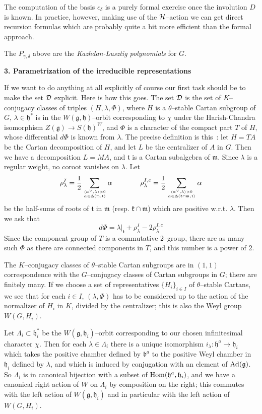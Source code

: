 \documentclass[11 pt]{article}
\def\ra{\rightarrow}
\def\a{\alpha}
\def\ac{\alpha^\vee}
\def\b{{\mathfrak b}}
\def\D{{\cal D}}
\def\d{\delta}
\def\F{\Phi}
\def\g{\gamma}
\def\gf{{\mathfrak g}}
\def\Hc{{\cal H}}
\def\Hom{{\rm Hom}}
\def\hf{{\mathfrak h}}
\def\kf{{\mathfrak k}}
\def\L{\Lambda}
\def\l{\lambda}
\def\mf{{\mathfrak m}}
\def\t{\theta}
\def\tf{{\mathfrak t}}
\begin{document}
The computation of the basis $c_\d$ is a purely formal exercise once the
involution $D$ is known. In practice, however, making use of the $\Hc$--action
we can get direct recursion formulas which are probably quite a bit more
efficient than the formal approach.

The $P_{\g,\d}$ above are the \textit{Kazhdan-Lusztig polynomials} for $G$.

\bigskip

\noindent\textbf{3. Parametrization of the irreducible representations}

\medskip

If we want to do anything at all explicitly of course our first task should be
to make the set $\D$ explicit. Here is how this goes. The set $\D$ is the
set of $K$--conjugacy classes of triples $(H,\l,\F)$, where $H$ is a
$\t$--stable Cartan subgroup of $G$, $\l\in\hf^*$ is in the $W(\gf,\hf)$--orbit
corresponding to $\chi$ under the Harish-Chandra isomorphism
$Z(\gf)\ra S(\hf)^W$, and $\F$ is
a character of the compact part $T$ of $H$, whose differential $d\F$ is
known from $\l$. The precise definition is this~: let $H=TA$ be the Cartan
decomposition of $H$, and let $L$ be the centralizer of $A$ in $G$. Then
we have a decomposition $L=MA$, and $\tf$ is a Cartan subalgebra of $\mf$.
Since $\l$ is a regular weight, no coroot vanishes on $\l$. Let
$$
\rho^I_\l=\frac{1}{2}\sum_{\langle\ac,\l\rangle>0\atop\a\in\Delta(\mf,\tf)}\a
\qquad\qquad
\rho^{I,c}_\l=\frac{1}{2}\sum_{\langle\ac,\l\rangle>0\atop\a\in
\Delta(\kf\cap\mf,\tf)}\a
$$
be the half-sums of roots of $\tf$ in $\mf$ (resp. $\kf\cap\mf$) which are
positive w.r.t. $\l$. Then we ask that
$$
d\F=\l|_\tf+\rho^I_\l-2\rho^{I,c}_\l
$$
Since the component group of $T$ is a commutative $2$--group, there are as many
such $\F$ as there are connected components in $T$, and this number is a power
of $2$.

The $K$--conjugacy classes of $\t$--stable Cartan subgroups are in $(1,1)$
correspondence with the $G$--conjugacy classes of Cartan subgroups in $G$;
there are finitely many. If we choose a set of representatives
$\{H_i\}_{i\in I}$ of $\t$--stable Cartans, we see that for each $i\in I$,
$(\l,\F)$ has to be considered up to the action of the normalizer of $H_i$
in $K$, divided by the centralizer; this is also the Weyl group $W(G,H_i)$.

Let $\L_i\subset\hf_i^*$ be the $W(\gf,\hf_i)$--orbit corresponding to our
chosen infinitesimal character $\chi$. Then for each $\l\in\L_i$ there is a
unique isomorphism $i_\l:\hf^a\ra\hf_i$ which takes the positive chamber
defined by $\b^a$ to the positive Weyl chamber in $\hf_i$ defined by $\l$,
and which is induced by conjugation with an element of ${\rm Ad}(\gf)$. So
$\L_i$ is in canonical bijection with a subset of $\Hom(\hf^a,\hf_i)$, and
we have a canonical right action of $W$ on $\L_i$ by composition on the right;
this commutes with the left action of $W(\gf,\hf_i)$ and in particular with
the left action of $W(G,H_i)$.
\end{document}
